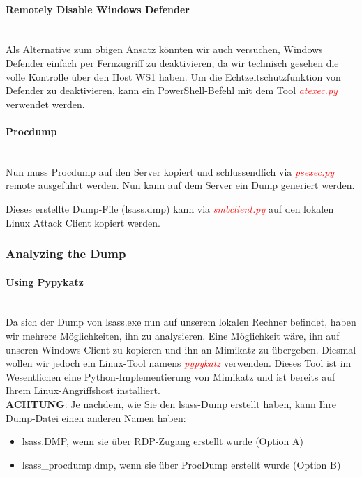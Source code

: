 \paragraph{Remotely Disable Windows Defender}\mbox{} \\
Als Alternative zum obigen Ansatz könnten wir auch versuchen, Windows Defender einfach per Fernzugriff zu deaktivieren, da wir technisch gesehen die volle Kontrolle über den Host WS1 haben.
Um die Echtzeitschutzfunktion von Defender zu deaktivieren, kann ein PowerShell-Befehl mit dem Tool \textcolor{red}{\textit{atexec.py}} verwendet werden.

\paragraph{Procdump}\mbox{} \\
Nun muss Procdump auf den Server kopiert und schlussendlich via \textcolor{red}{\textit{psexec.py}} remote ausgeführt werden.
Nun kann auf dem Server ein Dump generiert werden.

Dieses erstellte Dump-File (lsass.dmp) kann via \textcolor{red}{\textit{smbclient.py}} auf den lokalen Linux Attack Client kopiert werden.

\subsubsection{Analyzing the Dump}

\paragraph{Using Pypykatz}\mbox{} \\
Da sich der Dump von lsass.exe nun auf unserem lokalen Rechner befindet, haben wir mehrere Möglichkeiten, ihn zu analysieren. Eine Möglichkeit wäre, ihn auf unseren Windows-Client zu kopieren und ihn an Mimikatz zu übergeben. Diesmal wollen wir jedoch ein Linux-Tool namens \textcolor{red}{\textit{pypykatz}} verwenden.
Dieses Tool ist im Wesentlichen eine Python-Implementierung von Mimikatz und ist bereits auf Ihrem Linux-Angriffshost installiert.\\

\textbf{ACHTUNG}: Je nachdem, wie Sie den lsass-Dump erstellt haben, kann Ihre Dump-Datei einen anderen Namen haben:\\
\begin{itemize}
    \item lsass.DMP, wenn sie über RDP-Zugang erstellt wurde (Option A)
    \item lsass\_procdump.dmp, wenn sie über ProcDump erstellt wurde (Option B)\\
\end{itemize} 

